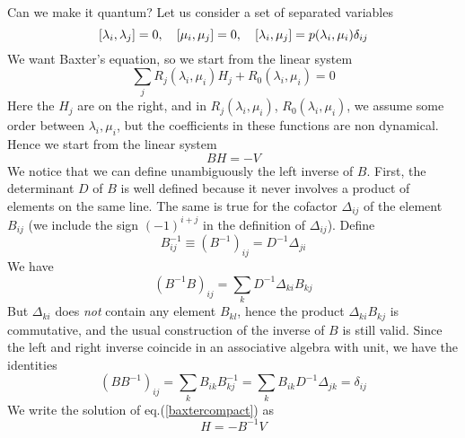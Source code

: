 \documentclass[a4paper,11pt]{article}
\begin{document}
Can we make it quantum? Let us consider a set of separated variables
$$
\relax [ \lambda_i,\lambda_j ] = 0, \quad [ \mu_i,\mu_j] =0, \quad
[ \lambda_i,\mu_j]  = p(\lambda_i, \mu_i) \delta_{ij}
$$
We want Baxter's equation, so we start 
from the linear system
\begin{equation}
\sum_j R_j(\lambda_i,\mu_i) H_j + R_0(\lambda_i,\mu_i) = 0
\label{baxter}
\end{equation}
Here the $ H_j$ are on the right, and in $R_j(\lambda_i,\mu_i)$, 
$R_0(\lambda_i,\mu_i)$, we assume some order between $\lambda_i,\mu_i$,
but the coefficients in these functions are non dynamical. Hence we start from the linear system
\begin{equation}
B H = -V
\label{baxtercompact}
\end{equation}
We notice that we can define unambiguously the left inverse of $B$.
First, the determinant $D$ of $B$ is well defined because it never 
involves a product of elements on the same line. The same is true
for the cofactor $\Delta_{ij}$ of the element  $B_{ij}$ (we include the sign $(-1)^{i+j}$ in the definition of $\Delta_{ij}$). 
Define
$$
B^{-1}_{ij} \equiv (B^{-1})_{ij} = D^{-1} \Delta_{ji}
$$
We have 
$$
(B^{-1} B)_{ij} = \sum_k D^{-1} \Delta_{ki} B_{kj}
$$
But $\Delta_{ki}$ does {\em not} contain any element $B_{kl}$, hence
the product $ \Delta_{ki} B_{kj}$ is commutative, and the usual 
construction of the inverse of $B$ is still valid. Since the left and right
inverse coincide in an associative algebra with unit, we have the identities
\begin{equation}
(BB^{-1})_{ij}=\sum_k  B_{ik} B^{-1}_{kj}
=\sum_k B_{ik} D^{-1} \Delta_{jk} = \delta_{ij}
\label{identityone}
\end{equation}
We write the solution of eq.(\ref{baxtercompact}) as
\begin{equation}
H = - B^{-1} V
\label{commutingquantities}
\end{equation}
\end{document}
